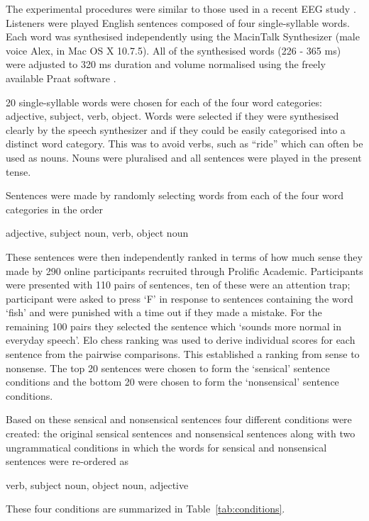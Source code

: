 \documentclass[a4paper,10pt,twoside]{article}
\begin{document}
The experimental procedures were similar to those used in a recent EEG
study \cite{DingEtAl2017}. Listeners were played English sentences
composed of four single-syllable words. Each word was synthesised
independently using the MacinTalk Synthesizer (male voice Alex, in Mac
OS X 10.7.5). All of the synthesised words (226 - 365 ms) were
adjusted to 320 ms duration and volume normalised using the freely
available Praat software \cite{BoersmaWeenink2018}.

20 single-syllable words were chosen for each of the four word
categories: adjective, subject, verb, object. Words were selected if
they were synthesised clearly by the speech synthesizer and if they
could be easily categorised into a distinct word category.  This was
to avoid verbs, such as ``ride'' which can
often be used as nouns. Nouns were pluralised and all sentences were
played in the present tense.

Sentences were made by randomly selecting words from each of the four
word categories in the order 
\begin{center}
adjective, subject noun, verb, object noun
\end{center}
These sentences were then independently ranked in terms of how
much sense they made by 290 online participants recruited through
Prolific Academic. Participants were presented with 110 pairs of
sentences, ten of these were an attention trap; participant were asked
to press \lq{F}\rq{} in response to sentences containing the word
\lq{}fish\rq{} and were punished with a time out if they made a
mistake. For the remaining 100 pairs they selected the sentence which
\lq{}sounds more normal in everyday speech\rq{}. Elo
chess ranking \cite{Elo1978} was used to derive individual scores for
each sentence from the pairwise comparisons. This established a
ranking from sense to nonsense. The top 20 sentences were chosen to form the
\lq{}sensical\rq{} sentence conditions and the bottom 20 were chosen to form the \lq{}nonsensical\rq{}
sentence conditions. 

Based on these sensical and nonsensical sentences four different conditions were created: the
original sensical sentences and nonsensical sentences along with two ungrammatical conditions in which the words for sensical and nonsensical sentences were re-ordered as
\begin{center}
     verb, subject noun, object noun, adjective
\end{center}
These four conditions are summarized in Table~\ref{tab:conditions}.
\end{document}
